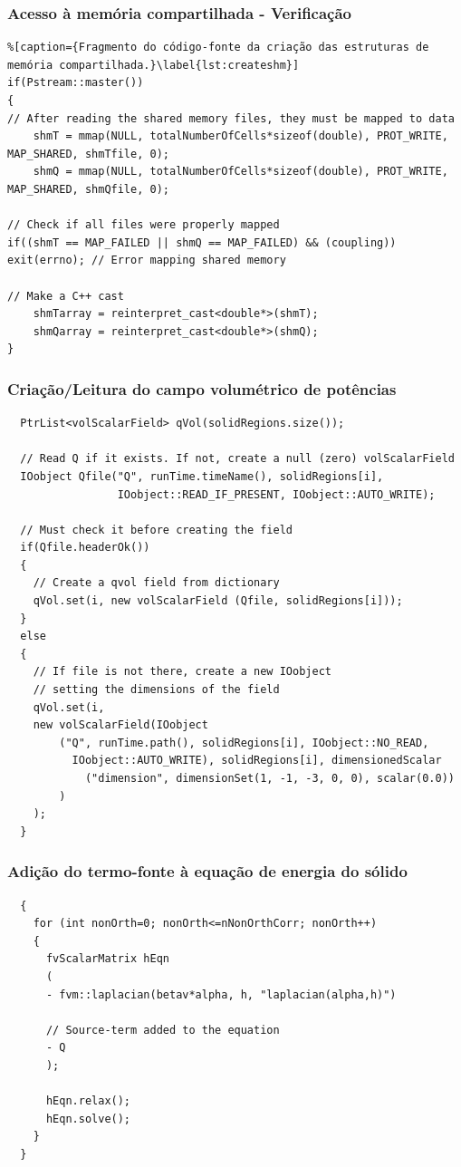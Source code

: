 \documentclass[svgnames,smaller,table]{beamer}
\begin{document}
\begin{frame}[fragile]
  \frametitle{Acesso à memória compartilhada - Verificação}
 \begin{lstlisting}%[caption={Fragmento do código-fonte da criação das estruturas de memória compartilhada.}\label{lst:createshm}]
if(Pstream::master())
{
// After reading the shared memory files, they must be mapped to data
    shmT = mmap(NULL, totalNumberOfCells*sizeof(double), PROT_WRITE, MAP_SHARED, shmTfile, 0);
    shmQ = mmap(NULL, totalNumberOfCells*sizeof(double), PROT_WRITE, MAP_SHARED, shmQfile, 0);

// Check if all files were properly mapped
if((shmT == MAP_FAILED || shmQ == MAP_FAILED) && (coupling)) exit(errno); // Error mapping shared memory

// Make a C++ cast
    shmTarray = reinterpret_cast<double*>(shmT);
    shmQarray = reinterpret_cast<double*>(shmQ);
}
 \end{lstlisting}
\end{frame}

\begin{frame}[fragile]
  \frametitle{Criação/Leitura do campo volumétrico de potências}
 \begin{lstlisting}
  PtrList<volScalarField> qVol(solidRegions.size());

  // Read Q if it exists. If not, create a null (zero) volScalarField
  IOobject Qfile("Q", runTime.timeName(), solidRegions[i],
                 IOobject::READ_IF_PRESENT, IOobject::AUTO_WRITE);

  // Must check it before creating the field
  if(Qfile.headerOk())
  {
    // Create a qvol field from dictionary
    qVol.set(i, new volScalarField (Qfile, solidRegions[i]));
  }
  else
  {
    // If file is not there, create a new IOobject
    // setting the dimensions of the field
    qVol.set(i,
    new volScalarField(IOobject
        ("Q", runTime.path(), solidRegions[i], IOobject::NO_READ,
          IOobject::AUTO_WRITE), solidRegions[i], dimensionedScalar
            ("dimension", dimensionSet(1, -1, -3, 0, 0), scalar(0.0))
        )
    );
  }
 \end{lstlisting}
\end{frame}

\begin{frame}[fragile]
  \frametitle{Adição do termo-fonte à equação de energia do sólido}
 \begin{lstlisting}
  {
    for (int nonOrth=0; nonOrth<=nNonOrthCorr; nonOrth++)
    {
      fvScalarMatrix hEqn
      (
      - fvm::laplacian(betav*alpha, h, "laplacian(alpha,h)")

      // Source-term added to the equation
      - Q
      );

      hEqn.relax();
      hEqn.solve();
    }
  }
 \end{lstlisting}
\end{frame}
\end{document}
